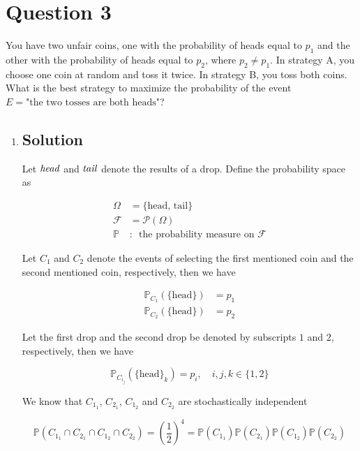 \documentclass[12pt]{article}
\newcommand{\bP}{\mathbb{P}}
\begin{document}
	
	\section*{Question 3}
	
	\noindent You have two unfair coins, one with the probability of heads equal to $p_1$ and the other with the probability of heads equal to $p_2$, where $p_2 \neq p_1$. In strategy A, you choose one coin at random and toss it twice. In strategy B, you toss both coins. What is the best strategy to maximize the probability of the event $E = \text{"the two tosses are both heads"}$?
	
	\begin{enumerate}[label={},leftmargin=0in]\item
		
		\subsection*{Solution}
			
			Let $\it{head}$ and $\it{tail}$ denote the results of a drop. Define the probability space as
		
			\[
			\begin{aligned}
				\Omega &= \{\mathrm{head},\,\mathrm{tail}\}\\
				\mathcal{F} &= \mathcal{P}(\Omega)\\
				\bP &:\enspace \text{the probability measure on $\mathcal{F}$}
			\end{aligned}
			\]
			
			Let $C_1$ and $C_2$ denote the events of selecting the first mentioned coin and the second mentioned coin, respectively, then we have
			
			\[
			\begin{aligned}
				\bP_{C_1}(\{\mathrm{head}\}) &= p_1\\
				\bP_{C_2}(\{\mathrm{head}\}) &= p_2
			\end{aligned}
			\]
			
			Let the first drop and the second drop be denoted by subscripts $1$ and $2$, respectively, then we have
			
			\[\bP_{C_{i_j}}(\{\mathrm{head}\}_k) = p_i,\quad i,j,k\in\{1,2\}\]
			
			We know that $C_{1_1}$, $C_{2_1}$, $C_{1_2}$ and $C_{2_2}$ are stochastically independent
			
			\[\bP(C_{1_1}\cap C_{2_1}\cap C_{1_2}\cap C_{2_2}) = \left(\frac{1}{2}\right)^4 = \bP(C_{1_1})\bP(C_{2_1})\bP(C_{1_2})\bP(C_{2_2})\]
			

\end{enumerate}
\end{document}
